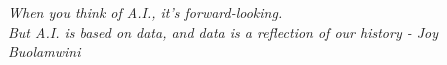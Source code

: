 \begin{titlepage}

\nonumber
\null {}
	\begin{flushright}
\textit{When you think of A.I., it’s forward-looking.\\ But A.I.
is based on data, and data is a reflection of our history - Joy Buolamwini} \\[4mm]
	\end{flushright}



\end{titlepage}